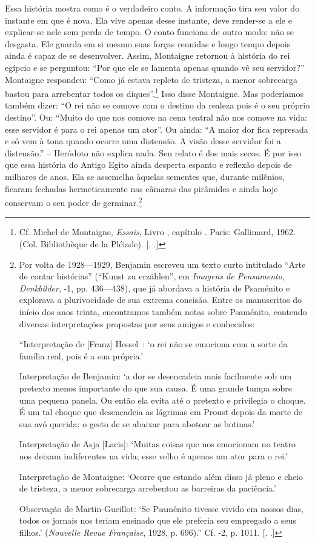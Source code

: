 Essa história mostra como é o verdadeiro conto. A informação tira seu
valor do instante em que é nova. Ela vive apenas desse instante, deve
render-se a ele e explicar-se nele sem perda de tempo. O conto funciona
de outro modo: não se desgasta. Ele guarda em si mesmo suas forças
reunidas e longo tempo depois ainda é capaz de se desenvolver. Assim,
Montaigne retornou à história do rei egípcio e se perguntou: ``Por que ele
se lamenta apenas quando vê seu servidor?'' Montaigne respondeu: ``Como já
estava repleto de tristeza, a menor sobrecarga bastou para arrebentar
todos os diques''.\footnote{Cf. Michel de Montaigne, \emph{Essais},
  Livro , capítulo . Paris: Gallimard, 1962. (Col. Bibliothèque de la
  Pléiade). [. .]} Isso disse Montaigne. Mas poderíamos também
dizer: ``O rei não se comove com o destino da realeza pois é o seu
próprio destino''. Ou: ``Muito do que nos comove na cena teatral não nos
comove na vida: esse servidor é para o rei apenas um ator''. Ou ainda:
``A maior dor fica represada e só vem à tona quando ocorre uma
distensão. A visão desse servidor foi a distensão.'' -- Heródoto não
explica nada. Seu relato é dos mais secos. É por isso que essa história
do Antigo Egito ainda desperta espanto e reflexão depois de milhares de
anos. Ela se assemelha àquelas sementes que, durante milênios, ficaram
fechadas hermeticamente nas câmaras das pirâmides e ainda hoje conservam
o seu poder de germinar.\footnote{Por volta de 1928---1929, Benjamin
  escreveu um texto curto intitulado ``Arte de contar histórias''
  (``Kunst zu erzählen'', em \emph{Imagens de Pensamento},
  \emph{Denkbilder},  -1, pp. 436---438), que já abordava a história
  de Psaménito e explorava a plurivocidade de sua extrema concisão.
  Entre os manuscritos do início dos anos trinta, encontramos também
  notas sobre Psaménito, contendo diversas interpretações propostas por
  seus amigos e conhecidos:

  ``Interpretação de [Franz] Hessel~: `o rei não se emociona com a
  sorte da família real, pois é a sua própria.'

  Interpretação de Benjamin: `a dor se desencadeia mais facilmente sob
  um pretexto menos importante do que sua causa. É uma grande tampa
  sobre uma pequena panela. Ou então ela evita até o pretexto e
  privilegia o choque. É um tal choque que desencadeia as lágrimas em
  Proust depois da morte de sua avó querida: o gesto de se abaixar para
  abotoar as botinas.'

  Interpretação de Asja [Lacis]: `Muitas coisas que nos emocionam no
  teatro nos deixam indiferentes na vida; esse velho é apenas um ator
  para o rei.'

  Interpretação de Montaigne: `Ocorre que estando além disso já pleno e
  cheio de tristeza, a menor sobrecarga arrebentou as barreiras da
  paciência.'

  Observação de Martin-Gueillot: `Se Psaménito tivesse vivido em nossos
  dias, todos os jornais nos teriam ensinado que ele preferia seu
  empregado a seus filhos.' (\emph{Nouvelle Revue Française}, 1928, p.
  696).'' Cf.  -2, p. 1011. [. .]}

